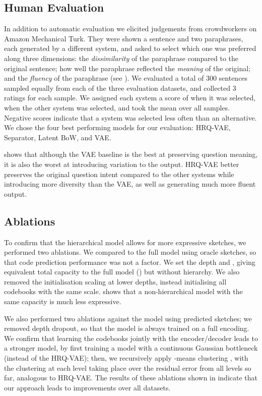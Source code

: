 \documentclass[11pt]{article}
\begin{document}
\subsection{Human Evaluation}

In addition to automatic evaluation we elicited judgements from
crowdworkers on Amazon Mechanical Turk. They were shown
a sentence and two paraphrases, each generated by a different system, and asked to select which one was preferred along three
dimensions: the \textit{dissimilarity} of the paraphrase compared to
the original sentence; how well the paraphrase reflected the
\textit{meaning} of the original; and the \textit{fluency} of the
paraphrase (see ). We evaluated a total of 300
sentences sampled equally from each of the three evaluation datasets, and collected 3
ratings for each sample. We assigned each system a score of  when
it was selected,  when the other system was selected, and took the
mean over all samples. Negative scores indicate that a system was
selected less often than an alternative. We chose the four best
performing models for our evaluation:
HRQ-VAE, Separator, Latent BoW, and VAE.


 shows that although the VAE baseline is the best
at preserving question meaning, it is also the worst at introducing
variation to the output. HRQ-VAE better preserves the original
question intent compared to the other systems while introducing more diversity than the VAE, as well as generating much more fluent
output.


\subsection{Ablations}

To confirm that the hierarchical model allows for more expressive sketches, we performed two ablations. We compared to the full model using oracle sketches, so that code prediction performance was not a factor. We set the depth  and , giving equivalent total capacity to the full model () but without hierarchy. We also removed the initialisation scaling at lower depths, instead initialising all codebooks with the same scale.  shows that a non-hierarchical model with the same capacity is much less expressive.


We also performed two ablations against the model using predicted sketches; we removed depth dropout, so that the model is always trained on a full encoding. We confirm that learning the codebooks jointly with the encoder/decoder leads to a stronger model, by first training a model with a continuous Gaussian bottleneck (instead of the HRQ-VAE); then, we recursively apply -means clustering \cite{kmeans}, with the clustering at each level taking place over the residual error from all levels so far, analogous to HRQ-VAE. The results of these ablations shown in  indicate that our approach leads to improvements over all datasets.
\end{document}
